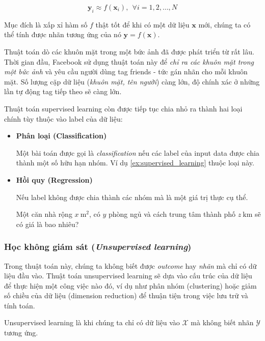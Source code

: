\documentclass[../main-report.tex]{subfiles}
\begin{document}
\[ \mathbf{y}_i \approx f(\mathbf{x}_i), ~~ \forall i = 1, 2, \dots, N\] 

Mục đích là xấp xỉ hàm số \(f\) thật tốt để khi có một dữ liệu \(\mathbf{x}\) mới, chúng ta có thể tính được nhãn tương ứng của nó \( \mathbf{y} = f(\mathbf{x}) \).

\begin{example} \label{ex:supervised_learning}
Thuật toán dò các khuôn mặt trong một bức ảnh đã được phát triển từ rất lâu. Thời gian đầu, Facebook sử dụng thuật toán này để \emph{chỉ ra các khuôn mặt trong một bức ảnh} và yêu cầu người dùng tag friends - tức gán nhãn cho mỗi khuôn mặt. Số lượng cặp dữ liệu (\emph{khuôn mặt, tên người}) càng lớn, độ chính xác ở những lần tự động tag tiếp theo sẽ càng lớn.
\end{example}

Thuật toán supervised learning còn được tiếp tục chia nhỏ ra thành hai loại chính tùy thuộc vào label của dữ liệu:

\begin{itemize}
\item \textbf{Phân loại (Classification)}

Một bài toán được gọi là \emph{classification} nếu các label của input data được chia thành một số hữu hạn nhóm. Ví dụ \ref{ex:supervised_learning} thuộc loại này.

\item \textbf{Hồi quy (Regression)}

Nếu label không được chia thành các nhóm mà là một giá trị thực cụ thể.

\begin{example}
Một căn nhà rộng \(x ~ \text{m}^2\), có \(y\) phòng ngủ và cách trung tâm thành phố \(z~ \text{km}\) sẽ có giá là bao nhiêu?
\end{example}
\end{itemize}

\subsubsection{Học không giám sát (\emph{Unsupervised learning})}
Trong thuật toán này, chúng ta không biết được \emph{outcome} hay \emph{nhãn} mà chỉ có dữ liệu đầu vào. Thuật toán unsupervised learning sẽ dựa vào cấu trúc của dữ liệu để thực hiện một công việc nào đó, ví dụ như phân nhóm (clustering) hoặc giảm số chiều của dữ liệu (dimension reduction) để thuận tiện trong việc lưu trữ và tính toán.

Unsupervised learning là khi chúng ta chỉ có dữ liệu vào \(\mathcal{X} \) mà không biết nhãn \(\mathcal{Y}\) tương ứng.
\end{document}
